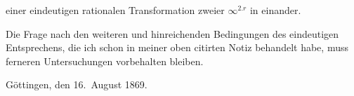\documentclass{article}
\begin{document}
einer eindeutigen rationalen Transformation zweier $\infty^{2.r}$ in einander.

Die Frage nach den weiteren und hinreichenden Bedingungen des eindeutigen Entsprechens, die ich schon in meiner oben citirten Notiz behandelt habe, muss ferneren Untersuchungen vorbehalten bleiben.

Göttingen, den 16.~August 1869.
\end{document}
